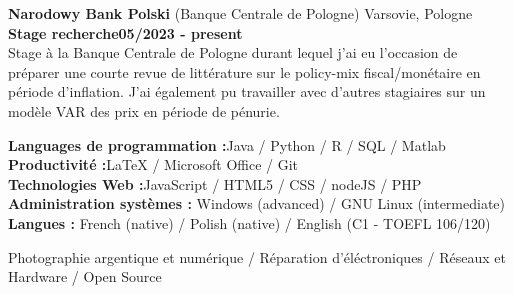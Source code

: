 \documentclass[11pt]{report}
\begin{document}
\noindent\textbf{Narodowy Bank Polski} (Banque Centrale de Pologne) \hfill Varsovie, Pologne \\[0.1cm]
\textbf{Stage recherche}\hfill \textbf{05/2023 - present} \\
Stage à la Banque Centrale de Pologne durant lequel j'ai eu l'occasion de préparer une courte revue de littérature sur le policy-mix fiscal/monétaire en période d'inflation. J'ai également pu travailler avec d'autres stagiaires sur un modèle VAR des prix en période de pénurie. 

	\begin{flushleft}
	 \hrulefill
	\end{flushleft}



  \noindent\textbf{Languages de programmation :}\hfill{Java / Python / R / SQL / Matlab} \\
  \textbf{Productivité :}\hfill LaTeX / Microsoft Office / Git\\
  \textbf{Technologies Web :}\hfill JavaScript / HTML5 / CSS / nodeJS / PHP  \\
  \textbf{Administration systèmes :} \hfill Windows (advanced) / GNU Linux (intermediate)\\
  \textbf{Langues :} \hfill French (native) / Polish (native) / English (C1 - TOEFL 106/120) 

	\begin{flushleft}
	 \hrulefill
	\end{flushleft}

\noindent Photographie argentique et numérique / Réparation d'éléctroniques / Réseaux et Hardware / Open Source
\end{document}
